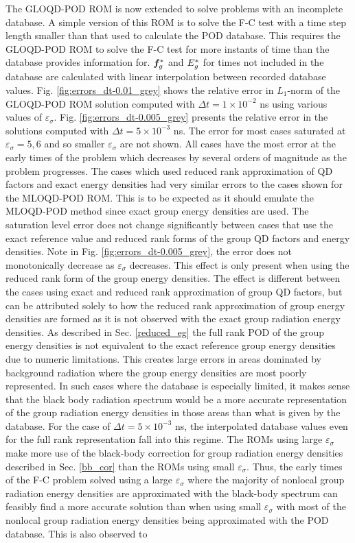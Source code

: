 	\ind The GLOQD-POD ROM is now extended to solve problems with an incomplete database. A simple version of this ROM is to solve the F-C test with a time step length smaller than that used to calculate the POD database. This requires the GLOQD-POD ROM to solve the F-C test for more instants of time than the database provides information for. $\bm{f}_g^*$ and $E_g^*$ for times not included in the database are calculated with linear interpolation between recorded database values. Fig. \ref{fig:errors_dt-0.01_grey} shows the  relative error in $L_1$-norm of the GLOQD-POD ROM solution computed with $\Delta t \! =  \! 1\! \times  \!  10^{-2}$ ns using various values of $\varepsilon_{\sigma}$. Fig. \ref{fig:errors_dt-0.005_grey}  presents the relative error in the solutions computed with $\Delta t \! = \! 5\! \times  \! 10^{-3}$ ns. The error for most cases saturated at $\varepsilon_\sigma = 5,6$ and so smaller $\varepsilon_\sigma$ are not shown. All cases have the most error at the early times of the problem which decreases by several orders of magnitude as the problem progresses. The cases which used reduced rank approximation of QD factors and exact energy densities had very similar errors to the cases shown for the MLOQD-POD ROM. This is to be expected as it should emulate the MLOQD-POD method since exact group energy densities are used. The saturation level error does not change significantly between cases that use the exact reference value and reduced rank forms of the group QD factors and energy densities. Note in Fig. \ref{fig:errors_dt-0.005_grey}, the error does not monotonically decrease as $\varepsilon_\sigma$ decreases. This effect is only present when using the reduced rank form of the group energy densities. The effect is different between the cases using exact and reduced rank approximation of group QD factors, but can be attributed solely to how the reduced rank approximation of group energy densities are formed as it is not observed with the exact group radiation energy densities. As described in Sec. \ref{reduced_eg} the full rank POD of the group energy densities is not equivalent to the exact reference group energy densities due to numeric limitations. This creates large errors in areas dominated by background radiation where the group energy densities are most poorly represented. In such cases where the database is especially limited, it makes sense that the black body radiation spectrum would be a more accurate representation of the group radiation energy densities in those areas than what is given by the database. For the case of $\Delta t \! = \! 5\! \times  \! 10^{-3}$ ns, the interpolated database values even for the full rank representation fall into this regime. The ROMs using large $\varepsilon_\sigma$ make more use of the black-body correction for group radiation energy densities described in Sec. \ref{bb_cor} than the ROMs using small $\varepsilon_\sigma$. Thus, the early times of the F-C problem solved using a large $\varepsilon_\sigma$ where the majority of nonlocal group radiation energy densities are approximated with the black-body spectrum can feasibly find a more accurate solution than when using small  $\varepsilon_\sigma$ with most of the nonlocal group radiation energy densities being approximated with the POD database. This is also observed to 